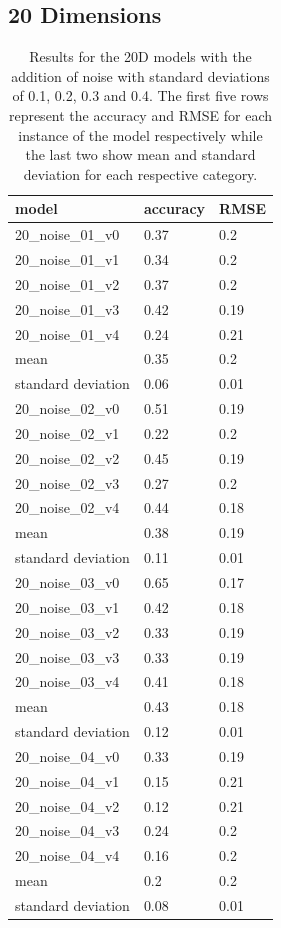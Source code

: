\subsection{20 Dimensions}

\begin{table}[!htb]
	\centering
	\caption{Results for the 20D models with the addition of noise with standard deviations of 0.1, 0.2, 0.3 and 0.4. The first five rows represent the accuracy and RMSE for each instance of the model respectively while the last two show mean and standard deviation for each respective category.}
	\begin{tabularx}{\textwidth}{ X  X  X }
		\hline
		model & accuracy & RMSE \\ 
		\hline
		20\_noise\_01\_v0 & 0.37 & 0.2\\
		20\_noise\_01\_v1 & 0.34 & 0.2\\
		20\_noise\_01\_v2 & 0.37& 0.2\\
		20\_noise\_01\_v3 & 0.42& 0.19\\
		20\_noise\_01\_v4 & 0.24& 0.21\\ 
		\hline
		mean & 0.35 & 0.2\\
		standard deviation & 0.06 & 0.01 \\
		\hline
		20\_noise\_02\_v0 & 0.51 & 0.19\\
		20\_noise\_02\_v1 & 0.22 & 0.2\\
		20\_noise\_02\_v2 & 0.45 & 0.19\\
		20\_noise\_02\_v3 & 0.27 & 0.2\\
		20\_noise\_02\_v4 & 0.44 & 0.18\\ 
		\hline
		mean & 0.38 & 0.19  \\
		standard deviation & 0.11 & 0.01 \\
		\hline
		20\_noise\_03\_v0 & 0.65 & 0.17 \\
		20\_noise\_03\_v1 & 0.42 & 0.18 \\
		20\_noise\_03\_v2 & 0.33 & 0.19 \\
		20\_noise\_03\_v3 & 0.33 & 0.19 \\
		20\_noise\_03\_v4 & 0.41 & 0.18 \\
		\hline
		mean & 0.43 & 0.18 \\
		standard deviation & 0.12 & 0.01 \\
		\hline
		20\_noise\_04\_v0 & 0.33 & 0.19 \\
		20\_noise\_04\_v1 & 0.15 & 0.21\\
		20\_noise\_04\_v2 & 0.12 & 0.21\\
		20\_noise\_04\_v3 & 0.24 & 0.2\\
		20\_noise\_04\_v4 & 0.16 & 0.2\\		
		\hline
		mean & 0.2 & 0.2\\
		standard deviation & 0.08 & 0.01\\
		\hline 
	\end{tabularx}
	\label{table:20_noise}
\end{table}

